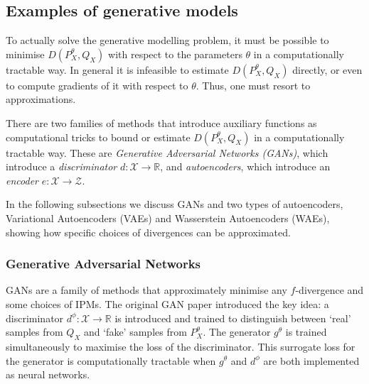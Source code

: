 


\subsection{Examples of generative models}

To actually solve the generative modelling problem, it must be possible to minimise $D(P^\theta_X, Q_X)$ with respect to the parameters $\theta$ in a computationally tractable way.
In general it is infeasible to estimate $D(P^\theta_X, Q_X)$ directly, or even to compute gradients of it with respect to $\theta$. 
Thus, one must resort to approximations.

There are two families of methods that introduce auxiliary functions as computational tricks to bound or estimate $D(P^\theta_X, Q_X)$ in a computationally tractable way.
These are \emph{Generative Adversarial Networks (GANs)}, which introduce a \emph{discriminator} $d:\mathcal{X} \to \mathbb{R}$, and \emph{autoencoders}, which introduce an \emph{encoder} $e:\mathcal{X} \to \mathcal{Z}$.

In the following subsections we discuss GANs and two types of autoencoders, Variational Autoencoders (VAEs) and Wasserstein Autoencoders (WAEs), showing how specific choices of divergences can be approximated.

\subsubsection{Generative Adversarial Networks}

GANs are a family of methods that approximately minimise any $f$-divergence and some choices of IPMs. 
The original GAN paper \citep{goodfellow} introduced the key idea: a discriminator $d^\phi: \mathcal{X} \to \mathbb{R}$ is introduced and trained to distinguish between `real' samples from $Q_X$ and `fake' samples from $P^\theta_X$. 
The generator $g^\theta$ is trained simultaneously to maximise the loss of the discriminator. 
This surrogate loss for the generator is computationally tractable when $g^\theta$ and $d^\phi$ are both implemented as neural networks.

